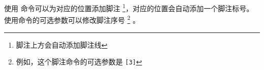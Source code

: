 \documentclass{article}
\begin{document}
使用 \boxforcmd{\footnote{}} 命令可以为对应的位置添加脚注 \footnote{脚注上方会自动添加脚注线}，对应的位置会自动添加一个脚注标号。使用命令的可选参数可以修改脚注序号 \footnote[3]{例如，这个脚注命令的可选参数是 {\tt [3]}} 。
\end{document}
